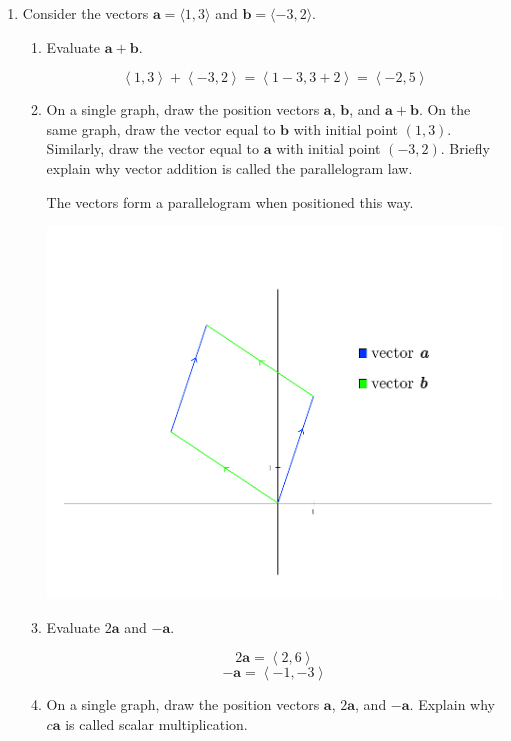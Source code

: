 \documentclass[12pt]{exam}
\newcommand{\gen}[1]{\left\langle #1 \right\rangle}
\newcommand{\ba}{\bm{a}}
\begin{document}
\begin{enumerate}
    \item{Consider the vectors $\mathbf{a}=\langle 1,3\rangle$ and $\mathbf{b}=\langle -3,2\rangle$.
        \begin{enumerate}
        \item{
                Evaluate $\mathbf{a}+\mathbf{b}$.
                \begin{solution}
                \[
                    \gen{1,3}+\gen{-3,2}=\gen{1-3,3+2}=\gen{-2,5}
                \]
                \end{solution}
            }
        \item{
           On a single graph, draw the position vectors $\mathbf{a}$, $\mathbf{b}$, and $\mathbf{a}+\mathbf{b}$.
           On the same graph, draw the vector equal to $\mathbf{b}$ with initial point $(1,3)$.
           Similarly, draw the vector equal to $\mathbf{a}$ with initial point $(-3,2)$.
           Briefly explain why vector addition is called the parallelogram law.}
        \begin{solution}
            The vectors form a parallelogram when positioned this way.
            \begin{center}
                \includegraphics[width=.55\textwidth]{12-1-paral.pdf}
            \end{center}
        \end{solution}
         \item{Evaluate $2\mathbf{a}$ and $-\mathbf{a}$.}

            \begin{solution}
                \[
                2\ba = \gen{2,6}
                \]
                \[
                    -\ba = \gen{-1,-3}
                \]
            \end{solution}
         
         \item{On a single graph, draw the position vectors $\mathbf{a}$, $2\mathbf{a}$, and $-\mathbf{a}$. Explain why $c\mathbf{a}$ is called scalar multiplication.
         }


\end{enumerate}}
\end{enumerate}
\end{document}
